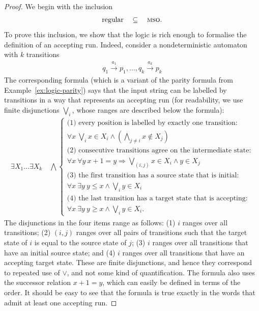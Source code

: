 \begin{proof}
    We begin with the inclusion 
    \begin{align*}
    \text{regular} \quad \subseteq \quad \text{{\textsc{mso}}.}
    \end{align*}
    To prove this inclusion, we show that the logic \mso is rich enough to formalise  the definition of an accepting run. Indeed, consider a nondeterministic automaton with $k$ transitions
    \begin{align*}
    q_1 \xrightarrow {a_1} p_1 ,\ldots, q_k \xrightarrow {a_k} p_k
    \end{align*}
    The corresponding \mso formula (which is a variant of the parity formula from Example~\ref{ex:logic-parity}) says that the input string can be labelled by transitions in a way that represents an accepting run (for readability, we use finite disjunctions $\bigvee_i$, whose ranges are described below the formula): 
    \begin{align*}
        \exists X_1 \ldots \exists X_k 
        \quad \bigwedge
        \begin{cases}
            \text{(1) every position is labelled by exactly one transition:}\\
            \forall x \ \bigvee_i x \in X_i  \land (\bigwedge_{j \neq i} x \not \in X_j)\\
            \text{(2) consecutive transitions agree on the intermediate state:}\\
            \forall x \ \forall y\  x+1 = y \Rightarrow \bigvee_{(i,j) } x \in X_i \land y \in X_j \\ 
            \text{(3) the first transition has a source state that is initial:}\\
            \forall x \ \exists y \ y \leq x \land \bigvee_{i} y \in X_i\\
            \text{(4) the last transition has a target state that is accepting:}\\
            \forall x \ \exists y \ y \geq x \land \bigvee_{i} y \in X_i.
        \end{cases}
    \end{align*}
The disjunctions in the four items range as follows: (1) $i$ ranges over all transitions; (2) $(i,j)$ ranges over all pairs of transitions   such that the target state of $i$ is equal to the source state of $j$; (3) $i$ ranges over all transitions that have an initial source state; and (4) $i$ ranges over all transitions that have an accepting target state. These are finite disjunctions, and hence they correspond to repeated use of $\lor$, and not some kind of quantification.  The formula also uses the successor relation $x+1 =y $, which can easily be defined in terms of the order. It should be easy to see that the formula is true exactly in the words that admit at least one accepting run.


\end{proof}

